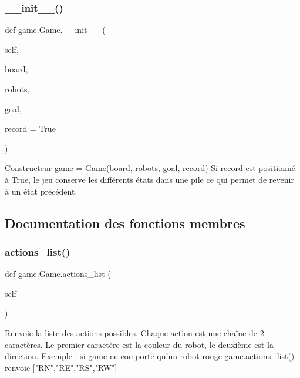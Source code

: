 \subsubsection{\texorpdfstring{\+\_\+\+\_\+init\+\_\+\+\_\+()}{\_\_init\_\_()}}
{\footnotesize\ttfamily def game.\+Game.\+\_\+\+\_\+init\+\_\+\+\_\+ (\begin{DoxyParamCaption}\item[{}]{self,  }\item[{}]{board,  }\item[{}]{robots,  }\item[{}]{goal,  }\item[{}]{record = {\ttfamily True} }\end{DoxyParamCaption})}

\begin{DoxyVerb}Constructeur
game = Game(board, robots, goal, record)
Si record est positionné à True, le jeu conserve les différents états dans une pile
ce qui permet de revenir à un état précédent.
\end{DoxyVerb}
 

\subsection{Documentation des fonctions membres}
\mbox{\label{classgame_1_1Game_a485f03c6330c2bb3284638de65b6cae0}} 
\subsubsection{\texorpdfstring{actions\+\_\+list()}{actions\_list()}}
{\footnotesize\ttfamily def game.\+Game.\+actions\+\_\+list (\begin{DoxyParamCaption}\item[{}]{self }\end{DoxyParamCaption})}

\begin{DoxyVerb}Renvoie la liste des actions possibles.
Chaque action est une chaîne de 2 caractères.
Le premier caractère est la couleur du robot, le deuxième est la direction.
Exemple : si game ne comporte qu'un robot rouge
game.actions_list() renvoie ["RN","RE","RS","RW"]
\end{DoxyVerb}
 \mbox{\label{classgame_1_1Game_a2c3428bb9f61284ee0febe00d7850dfa}} 
